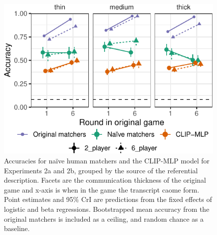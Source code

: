 \documentclass[10pt, letterpaper]{article}
\begin{document}
\begin{CodeChunk}
\begin{figure}[t]

{\centering \includegraphics[width=0.9\linewidth]{figs/fig-condition-1} 

}

\caption[Accuracies for naïve human matchers and the CLIP-MLP model for Experiments 2a and 2b, grouped by the source of the referential description]{Accuracies for naïve human matchers and the CLIP-MLP model for Experiments 2a and 2b, grouped by the source of the referential description. Facets are the communication thickness of the original game and x-axis is when in the game the transcript caome form. Point estimates and 95\% CrI are predictions from the fixed effects of logistic and beta regressions. Bootstrapped mean accuracy from the original matchers is included as a ceiling, and random chance as a baseline. \label{expt2-condition}}\label{fig:fig-condition}
\end{figure}
\end{CodeChunk}
\end{document}
